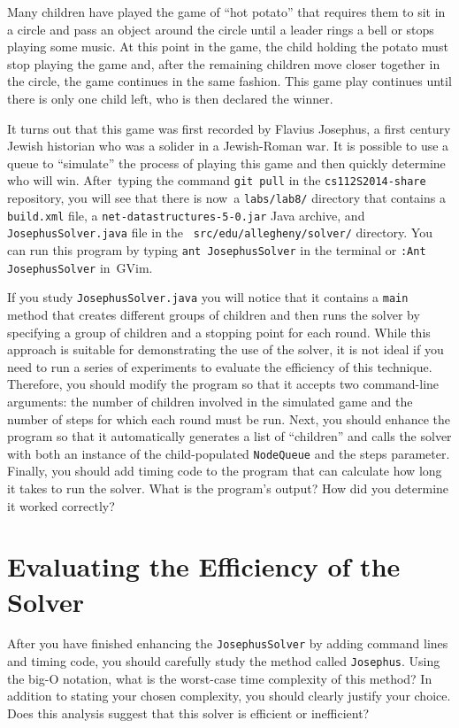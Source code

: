   Many children have played the game of ``hot potato'' that requires them to sit in a circle and pass an object around
  the circle until a leader rings a bell or stops playing some music.  At this point in the game, the child holding the
  potato must stop playing the game and, after the remaining children move closer together in the circle, the game
  continues in the same fashion. This game play continues until there is only one child left, who is then declared the
  winner.

  It turns out that this game was first recorded by Flavius Josephus, a first century Jewish historian who was a solider
  in a Jewish-Roman war.  It is possible to use a queue to ``simulate'' the process of playing this game and then
  quickly determine who will win.  \mbox{After typing} the command {\tt git pull} in the {\tt cs112S2014-share}
  repository, you will see that there is \mbox{now a} {\tt labs/lab8/} directory that contains a {\tt build.xml} file, a
  {\tt net-datastructures-5-0.jar} Java archive, and {\tt JosephusSolver.java} file in the {\tt
    src/edu/allegheny/solver/} directory.  You can run this program by typing {\tt ant JosephusSolver} in the terminal
  or {\tt :Ant JosephusSolver} \mbox{in GVim}.

  If you study {\tt JosephusSolver.java} you will notice that it contains a {\tt main} method that creates different
  groups of children and then runs the solver by specifying a group of children and a stopping point for each round.
  While this approach is suitable for demonstrating the use of the solver, it is not ideal if you need to run a series
  of experiments to evaluate the efficiency of this technique. Therefore, you should modify the program so that it
  accepts two command-line arguments: the number of children involved in the simulated game and the number of steps for
  which each round must be run. Next, you should enhance the program so that it automatically generates a list of
  ``children'' and calls the solver with both an instance of the child-populated {\tt NodeQueue} and the steps
  parameter. Finally, you should add timing code to the program that can calculate how long it takes to run the solver.
  What is the program's output? How did you determine it worked correctly?

\section*{Evaluating the Efficiency of the Solver}

  After you have finished enhancing the {\tt JosephusSolver} by adding command lines and timing code, you should
  carefully study the method called {\tt Josephus}.  Using the big-O notation, what is the worst-case time complexity of
  this method?  In addition to stating your chosen complexity, you should clearly justify your choice. Does this
  analysis suggest that this solver is efficient or inefficient? 

